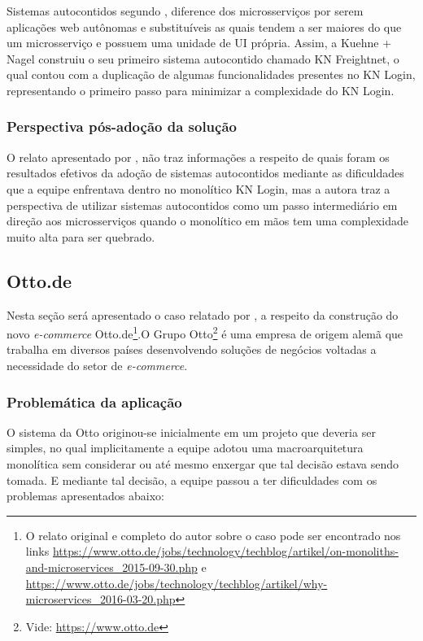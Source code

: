 Sistemas autocontidos segundo , diference dos
microsserviços por serem aplicações web autônomas e substituíveis as quais tendem a ser maiores do
que um microsserviço e possuem uma unidade de \gls{UI} própria. Assim, a Kuehne + Nagel construiu o
seu primeiro sistema autocontido chamado KN Freightnet, o qual contou com a duplicação de algumas
funcionalidades presentes no KN Login, representando o primeiro passo para minimizar a complexidade
do KN Login.

\subsubsection{Perspectiva pós-adoção da solução}

O relato apresentado por , não traz informações a respeito
de quais foram os resultados efetivos da adoção de sistemas autocontidos mediante as dificuldades
que a equipe enfrentava dentro no monolítico KN Login, mas a autora traz a perspectiva de utilizar
sistemas autocontidos como um passo intermediário em direção aos microsserviços quando o monolítico
em mãos tem uma complexidade muito alta para ser quebrado.

\subsection{Otto.de}

Nesta seção será apresentado o caso relatado por  , a
respeito da construção do novo \textit{e-commerce} Otto.de\footnote{O relato original e completo do autor
sobre o caso pode ser encontrado nos links
\url{https://www.otto.de/jobs/technology/techblog/artikel/on-monoliths-and-microservices_2015-09-30.php}
e \url{https://www.otto.de/jobs/technology/techblog/artikel/why-microservices_2016-03-20.php}}.O Grupo
Otto\footnote{Vide: \url{https://www.otto.de}} é uma empresa de origem alemã que trabalha em diversos países
desenvolvendo soluções de negócios voltadas a necessidade do setor de \textit{e-commerce}.

\subsubsection{Problemática da aplicação}

O sistema da Otto originou-se inicialmente em um projeto que deveria ser simples, no qual
implicitamente a equipe adotou uma macroarquitetura monolítica sem considerar ou até mesmo enxergar
que tal decisão estava sendo tomada. E mediante tal decisão, a equipe passou a ter dificuldades
com os problemas apresentados abaixo:

